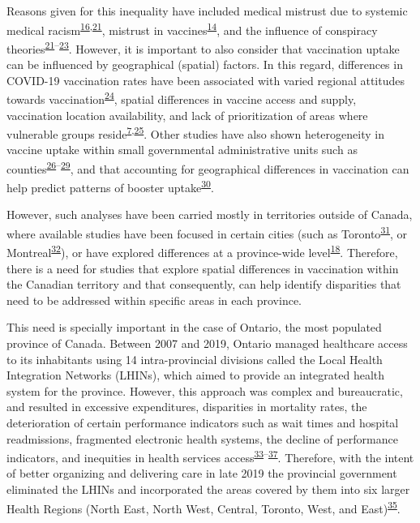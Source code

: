 \documentclass[
  letterpaper,
  DIV=11,
  numbers=noendperiod]{scrartcl}
\begin{document}
Reasons given for this inequality have included medical mistrust due to
systemic medical
racism\textsuperscript{\protect\hyperlink{ref-stoler2021}{16},\protect\hyperlink{ref-mosby2021}{21}},
mistrust in
vaccines\textsuperscript{\protect\hyperlink{ref-willis2021}{14}}, and
the influence of conspiracy
theories\textsuperscript{\protect\hyperlink{ref-mosby2021}{21}--\protect\hyperlink{ref-freeman2020}{23}}.
However, it is important to also consider that vaccination uptake can be
influenced by geographical (spatial) factors. In this regard,
differences in COVID-19 vaccination rates have been associated with
varied regional attitudes towards
vaccination\textsuperscript{\protect\hyperlink{ref-malik2020}{24}},
spatial differences in vaccine access and supply, vaccination location
availability, and lack of prioritization of areas where vulnerable
groups
reside\textsuperscript{\protect\hyperlink{ref-bogoch2022}{7},\protect\hyperlink{ref-nguyen2021}{25}}.
Other studies have also shown heterogeneity in vaccine uptake within
small governmental administrative units such as
counties\textsuperscript{\protect\hyperlink{ref-mollalo2021}{26}--\protect\hyperlink{ref-bhuiyan2022}{29}},
and that accounting for geographical differences in vaccination can help
predict patterns of booster
uptake\textsuperscript{\protect\hyperlink{ref-wood2022}{30}}.

However, such analyses have been carried mostly in territories outside
of Canada, where available studies have been focused in certain cities
(such as Toronto\textsuperscript{\protect\hyperlink{ref-choi2021}{31}},
or Montreal\textsuperscript{\protect\hyperlink{ref-mckinnon2021}{32}}),
or have explored differences at a province-wide
level\textsuperscript{\protect\hyperlink{ref-guay2022}{18}}. Therefore,
there is a need for studies that explore spatial differences in
vaccination within the Canadian territory and that consequently, can
help identify disparities that need to be addressed within specific
areas in each province.

This need is specially important in the case of Ontario, the most
populated province of Canada. Between 2007 and 2019, Ontario managed
healthcare access to its inhabitants using 14 intra-provincial divisions
called the Local Health Integration Networks (LHINs), which aimed to
provide an integrated health system for the province. However, this
approach was complex and bureaucratic, and resulted in excessive
expenditures, disparities in mortality rates, the deterioration of
certain performance indicators such as wait times and hospital
readmissions, fragmented electronic health systems, the decline of
performance indicators, and inequities in health services
access\textsuperscript{\protect\hyperlink{ref-tsasis2012}{33}--\protect\hyperlink{ref-lysyk2016}{37}}.
Therefore, with the intent of better organizing and delivering care in
late 2019 the provincial government eliminated the LHINs and
incorporated the areas covered by them into six larger Health Regions
(North East, North West, Central, Toronto, West, and
East)\textsuperscript{\protect\hyperlink{ref-dong2022}{35}}.
\end{document}
